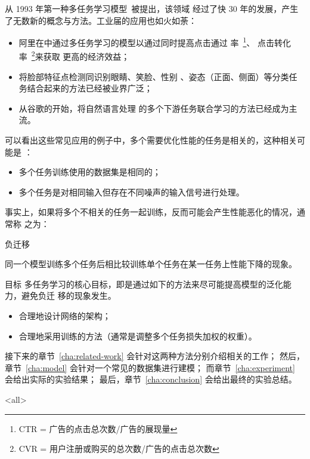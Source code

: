 \documentclass[../main]{subfiles}
\begin{document}
从 1993 年第一种多任务学习模型~\cite{DBLP:conf/icml/Caruana93}被提出，该领域
经过了快 30 年的发展，产生了无数新的概念与方法。工业届的应用也如火如荼：

\begin{itemize}
  \item 阿里在\cite{ma2018entire}中通过多任务学习的模型以通过同时提高点击通过
    率~\footnote{CTR = 广告的点击总次数/广告的展现量}、
    点击转化率~\footnote{CVR = 用户注册或购买的总次数/广告的点击总次数}来获取
    更高的经济效益；
  \item\cite{DBLP:conf/eccv/ZhangLLT14}将脸部特征点检测同识别眼睛、笑脸、性别
    、姿态（正面、侧面）等分类任务结合起来的方法已经被业界广泛；
  \item 从谷歌的\cite{DBLP:journals/corr/abs-1810-04805}开始，将自然语言处理
    的多个下游任务联合学习的方法已经成为主流。
\end{itemize}

可以看出这些常见应用的例子中，多个需要优化性能的任务是相关的，这种相关可能是
：

\begin{itemize}
  \item 多个任务训练使用的数据集是相同的；
  \item 多个任务是对相同输入但存在不同噪声的输入信号进行处理。
\end{itemize}

事实上，如果将多个不相关的任务一起训练，反而可能会产生性能恶化的情况，通常称
之为：

\begin{frame}{负迁移}
  \begin{definition}[负迁移]
    同一个模型训练多个任务后相比较训练单个任务在某一任务上性能下降的现象。
  \end{definition}
\end{frame}

\begin{frame}{目标}
  多任务学习的核心目标，即是通过如下的方法来尽可能提高模型的泛化能力，避免负迁
  移的现象发生。

  \begin{itemize}
    \item 合理地设计网络的架构；
    \item 合理地采用训练的方法（通常是调整多个任务损失加权的权重）。
  \end{itemize}
\end{frame}

接下来的章节~\ref{cha:related-work} 会针对这两种方法分别介绍相关的工作；
然后，章节~\ref{cha:model} 会针对一个常见的数据集进行建模；
而章节~\ref{cha:experiment} 会给出实际的实验结果；
最后，章节~\ref{cha:conclusion} 会给出最终的实验总结。

\mode<all>
\end{document}

